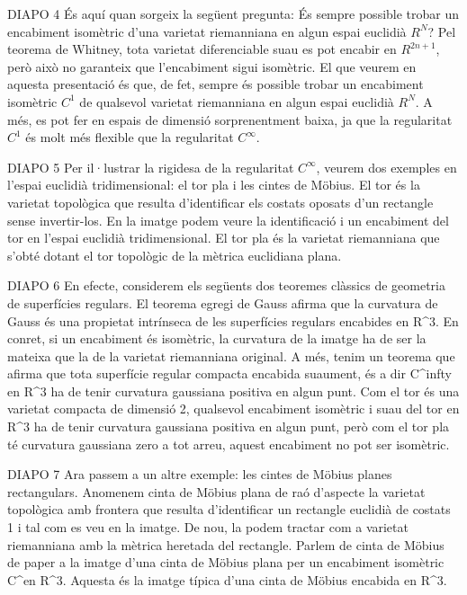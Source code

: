 DIAPO 4
És aquí quan sorgeix la següent pregunta: 
És sempre possible trobar un encabiment isomètric d'una varietat riemanniana en algun espai euclidià $R^N$?
Pel teorema de Whitney, tota varietat diferenciable suau es pot encabir en $R^{2n+1}$, però això no garanteix que l'encabiment sigui isomètric.
El que veurem en aquesta presentació és que, de fet, sempre és possible trobar un encabiment isomètric $C^1$ de qualsevol varietat riemanniana en algun espai euclidià $R^N$. A més, es pot fer en espais de dimensió sorprenentment baixa, ja que la regularitat $C^1$ és molt més flexible que la regularitat $C^\infty$.

DIAPO 5
Per il·lustrar la rigidesa de la regularitat $C^\infty$, veurem dos exemples en l'espai euclidià tridimensional: el tor pla i les cintes de Möbius.
El tor és la varietat topològica que resulta d'identificar els costats oposats d'un rectangle sense invertir-los. En la imatge podem veure la identificació i un encabiment del tor en l'espai euclidià tridimensional.
El tor pla és la varietat riemanniana que s'obté dotant el tor topològic de la mètrica euclidiana plana.

DIAPO 6
En efecte, considerem els següents dos teoremes clàssics de geometria de superfícies regulars.
El teorema egregi de Gauss afirma que la curvatura de Gauss és una propietat intrínseca de les superfícies regulars encabides en R^3. En conret, si un encabiment és isomètric, la curvatura de la imatge ha de ser la mateixa que la de la varietat riemanniana original.
A més, tenim un teorema que afirma que tota superfície regular compacta encabida suaument, és a dir C^infty en R^3 ha de tenir curvatura gaussiana positiva en algun punt.
Com el tor és una varietat compacta de dimensió 2, qualsevol encabiment isomètric i suau del tor en R^3 ha de tenir curvatura gaussiana positiva en algun punt, però com el tor pla té curvatura gaussiana zero a tot arreu, aquest encabiment no pot ser isomètric.

DIAPO 7
Ara passem a un altre exemple: les cintes de Möbius planes rectangulars.
Anomenem cinta de Möbius plana de raó d'aspecte \lambda la varietat topològica amb frontera que resulta d'identificar un rectangle euclidià de costats 1 i \lambda tal com es veu en la imatge. De nou, la podem tractar com a varietat riemanniana amb la mètrica heretada del rectangle. Parlem de cinta de Möbius de paper a la imatge d'una cinta de Möbius plana per un encabiment isomètric C^\infty en R^3.
Aquesta és la imatge típica d'una cinta de Möbius encabida en R^3.

